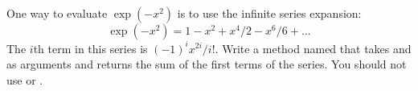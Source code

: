 \begin{exercise}

One way to evaluate $\exp(-x^2)$ is to use the infinite series expansion:
%
\[ \exp(-x^2) = 1 - x^2 + x^4/2 - x^6/6 + \ldots \]
%
The $i$th term in this series is $(-1)^i x^{2i} / i!$.
Write a method named  that takes  and  as arguments and returns the sum of the first  terms of the series.
You should not use  or .

\end{exercise}
